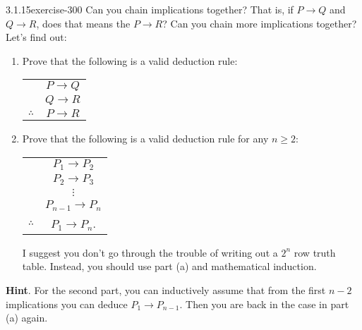 \documentclass[twoside,11pt,]{book}
\numberwithin{equation}{chapter}
\newcommand{\hrulethin}  {\noalign{\hrule height 0.04em}}
\newcommand{\imp}{\rightarrow}
\begin{document}
\begin{divisionsolution}{3.1.15}{}{exercise-300}%
\hypertarget{p-3987}{}%
Can you chain implications together? That is, if \(P \imp Q\) and \(Q \imp R\), does that means the \(P \imp R\)? Can you chain more implications together? Let's find out:\leavevmode%
\begin{enumerate}[label=(\alph*)]
\item\hypertarget{li-2081}{}\hypertarget{p-3988}{}%
Prove that the following is a valid deduction rule:%
\begin{sidebyside}{1}{0}{0}{0}%
\begin{sbspanel}{1}%
{\centering%
\begin{tabular}{cc}
&\(P \imp Q\)\tabularnewline[0pt]
&\(Q \imp R\)\tabularnewline\hrulethin
\(\therefore\)&\(P \imp R\)
\end{tabular}
\par}
\end{sbspanel}%
\end{sidebyside}%
\item\hypertarget{li-2082}{}\hypertarget{p-3989}{}%
Prove that the following is a valid deduction rule for any \(n \ge 2\):%
\begin{sidebyside}{1}{0}{0}{0}%
\begin{sbspanel}{1}%
{\centering%
\begin{tabular}{cc}
&\(P_1 \imp P_2\)\tabularnewline[0pt]
&\(P_2 \imp P_3\)\tabularnewline[0pt]
&\(\vdots\)\tabularnewline[0pt]
&\(P_{n-1} \imp P_n\)\tabularnewline\hrulethin
\(\therefore\)&\(P_1 \imp P_n\).
\end{tabular}
\par}
\end{sbspanel}%
\end{sidebyside}%
\par
\hypertarget{p-3990}{}%
I suggest you don't go through the trouble of writing out a \(2^n\) row truth table. Instead, you should use part (a) and mathematical induction. %
\end{enumerate}
%
\par\smallskip%
\noindent\textbf{Hint}.\quad%
\hypertarget{p-3991}{}%
For the second part, you can inductively assume that from the first \(n-2\) implications you can deduce \(P_1 \imp P_{n-1}\).  Then you are back in the case in part (a) again.%
\end{divisionsolution}%
\end{document}

